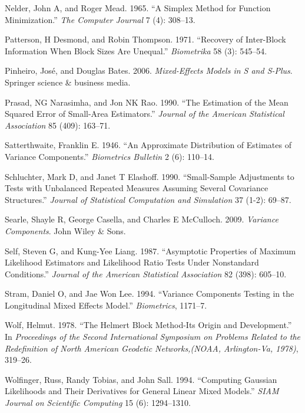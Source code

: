 \documentclass{article}
\begin{document}
\leavevmode\hypertarget{ref-nelder1965simplex}{}%
Nelder, John A, and Roger Mead. 1965. ``A Simplex Method for Function
Minimization.'' \emph{The Computer Journal} 7 (4): 308--13.

\leavevmode\hypertarget{ref-patterson1971recovery}{}%
Patterson, H Desmond, and Robin Thompson. 1971. ``Recovery of
Inter-Block Information When Block Sizes Are Unequal.''
\emph{Biometrika} 58 (3): 545--54.

\leavevmode\hypertarget{ref-pinheiro2006mixed}{}%
Pinheiro, José, and Douglas Bates. 2006. \emph{Mixed-Effects Models in S
and S-Plus}. Springer science \& business media.

\leavevmode\hypertarget{ref-prasad1990estimation}{}%
Prasad, NG Narasimha, and Jon NK Rao. 1990. ``The Estimation of the Mean
Squared Error of Small-Area Estimators.'' \emph{Journal of the American
Statistical Association} 85 (409): 163--71.

\leavevmode\hypertarget{ref-satterthwaite1946approximate}{}%
Satterthwaite, Franklin E. 1946. ``An Approximate Distribution of
Estimates of Variance Components.'' \emph{Biometrics Bulletin} 2 (6):
110--14.

\leavevmode\hypertarget{ref-schluchter1990small}{}%
Schluchter, Mark D, and Janet T Elashoff. 1990. ``Small-Sample
Adjustments to Tests with Unbalanced Repeated Measures Assuming Several
Covariance Structures.'' \emph{Journal of Statistical Computation and
Simulation} 37 (1-2): 69--87.

\leavevmode\hypertarget{ref-searle2009variance}{}%
Searle, Shayle R, George Casella, and Charles E McCulloch. 2009.
\emph{Variance Components}. John Wiley \& Sons.

\leavevmode\hypertarget{ref-self1987asymptotic}{}%
Self, Steven G, and Kung-Yee Liang. 1987. ``Asymptotic Properties of
Maximum Likelihood Estimators and Likelihood Ratio Tests Under
Nonstandard Conditions.'' \emph{Journal of the American Statistical
Association} 82 (398): 605--10.

\leavevmode\hypertarget{ref-stram1994variance}{}%
Stram, Daniel O, and Jae Won Lee. 1994. ``Variance Components Testing in
the Longitudinal Mixed Effects Model.'' \emph{Biometrics}, 1171--7.

\leavevmode\hypertarget{ref-wolf1978helmert}{}%
Wolf, Helmut. 1978. ``The Helmert Block Method-Its Origin and
Development.'' In \emph{Proceedings of the Second International
Symposium on Problems Related to the Redefinition of North American
Geodetic Networks,(NOAA, Arlington-Va, 1978)}, 319--26.

\leavevmode\hypertarget{ref-wolfinger1994computing}{}%
Wolfinger, Russ, Randy Tobias, and John Sall. 1994. ``Computing Gaussian
Likelihoods and Their Derivatives for General Linear Mixed Models.''
\emph{SIAM Journal on Scientific Computing} 15 (6): 1294--1310.



\end{document}
